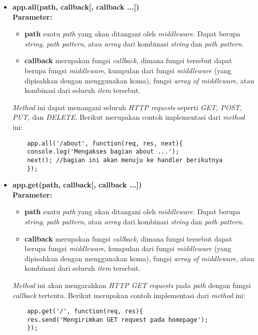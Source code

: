 \begin{itemize}
	\item \textbf{app.all(path, callback[, callback ...])} \\ \textbf{Parameter:} 
	\begin{itemize}
		\item \textbf{path} suatu \textit{path} yang akan ditangani oleh \textit{middleware}. Dapat berupa \textit{string}, \textit{path pattern}, atau \textit{array} dari kombinasi \textit{string} dan \textit{path pattern}.
		
		\item \textbf{callback} merupakan fungsi \textit{callback}, dimana fungsi tersebut dapat berupa fungsi \textit{middleware}, kumpulan dari fungsi \textit{middleware} (yang dipisahkan dengan menggunakan koma), fungsi \textit{array of middleware}, atau kombinasi dari seluruh \textit{item} tersebut.
	\end{itemize}
	
	\textit{Method} ini dapat menangani seluruh \textit{HTTP requests} seperti \textit{GET, POST, PUT,} dan \textit{DELETE}. Berikut merupakan contoh implementasi dari \textit{method} ini:
	\begin{lstlisting}
	app.all('/about', function(req, res, next){
	console.log('Mengakses bagian about ...');
	next(); //bagian ini akan menuju ke handler berikutnya
	});
	\end{lstlisting}
	
	\item \textbf{app.get(path, callback[, callback ...])} \\ \textbf{Parameter:}
	\begin{itemize}
		\item \textbf{path} suatu \textit{path} yang akan ditangani oleh \textit{middleware}. Dapat berupa \textit{string}, \textit{path pattern}, atau \textit{array} dari kombinasi \textit{string} dan \textit{path pattern}.
		
		\item \textbf{callback} merupakan fungsi \textit{callback}, dimana fungsi tersebut dapat berupa fungsi \textit{middleware}, kumpulan dari fungsi \textit{middleware} (yang dipisahkan dengan menggunakan koma), fungsi \textit{array of middleware}, atau kombinasi dari seluruh \textit{item} tersebut.
	\end{itemize}
	
	\textit{Method} ini akan mengarahkan \textit{HTTP GET requests} pada \textit{path} dengan fungsi \textit{callback} tertentu. Berikut merupakan contoh implementasi dari \textit{method} ini:
	\begin{lstlisting}
	app.get('/', function(req, res){
	res.send('Mengirimkan GET request pada homepage');
	});
	\end{lstlisting}
	

\end{itemize}
